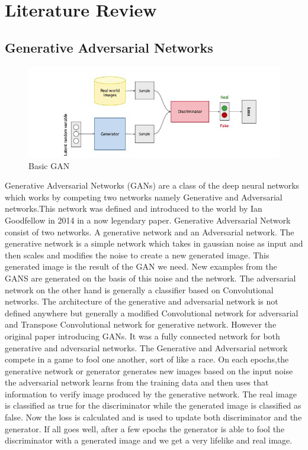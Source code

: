 \documentclass{article}
\begin{document}
 
\newpage
\section{Literature Review}
\subsection{Generative Adversarial Networks}

\begin{figure}[H]
    \centering
    \includegraphics[width=15cm]{images/GAN/basicGAN.png}
    \caption{Basic GAN}
    \label{fig:my_label}
\end{figure}
Generative Adversarial Networks (GANs) are a class of the deep neural networks which works by competing two networks namely Generative and Adversarial networks.This network was defined and introduced to the world by Ian Goodfellow in 2014 in a now legendary paper. Generative Adversarial Network consist of two networks. A generative network and an Adversarial network. The generative network is a simple network which takes in gaussian noise as input and then scales and modifies the noise to create a new generated image. This generated image is the result of the GAN we need. New examples from the GANS are generated on the basis of this noise and the network. The adversarial network on the other hand is generally a classifier based on Convolutional networks. The architecture of the generative and adversarial network is not defined anywhere but generally a modified Convolutional network for adversarial and Transpose Convolutional network for generative network. However the original paper introducing GANs. It was a fully connected network for both generative and adversarial networks.
The Generative and Adversarial network compete in a game to fool one another, sort of like a race. On each epochs,the generative network or generator generates new images based on the input noise  the adversarial network learns from the training data and then uses that information to verify image produced by the generative network. The real image is classified as true for the discriminator while the generated image is classified as false. Now the loss is calculated and is used to update both discriminator and the generator. If all goes well, after a few epochs the generator is able to fool the discriminator with a generated image and we get a very lifelike and real image.
 
\end{document}
